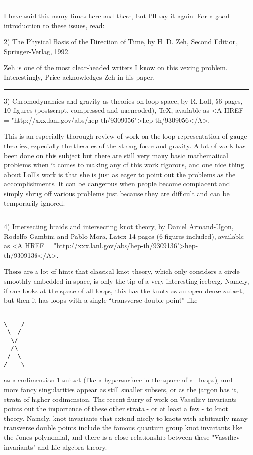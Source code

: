 \par\noindent\rule{\textwidth}{0.4pt}
I have said this many times here and there, but I'll say it again.  For
a good introduction to these issues, read:

2) The Physical Basis of the Direction of Time, by H. D. Zeh, Second
Edition, Springer-Verlag, 1992.

Zeh is one of the most clear-headed writers I know on this vexing
problem.  Interestingly, Price acknowledges Zeh in his paper.

\par\noindent\rule{\textwidth}{0.4pt}

3)  Chromodynamics and gravity as theories on loop space, by R.
Loll, 56 pages, 10 figures (postscript, compressed and uuencoded), TeX,
available as <A HREF = "http://xxx.lanl.gov/abs/hep-th/9309056">hep-th/9309056</A>.

This is an especially thorough review of work on the loop representation
of gauge theories, especially the theories of the strong force and
gravity.  A lot of work has been done on this subject but there are
still very many basic mathematical problems when it comes to making any
of this work rigorous, and one nice thing about Loll's work is that she
is just as eager to point out the problems as the accomplishments.  It
can be dangerous when people become complacent and simply shrug off
various problems just because they are difficult and can be temporarily
ignored.  

\par\noindent\rule{\textwidth}{0.4pt}

4) Intersecting braids and intersecting knot theory, by Daniel Armand-Ugon,
Rodolfo Gambini and Pablo Mora, Latex 14 pages (6 figures included),
available as <A HREF = "http://xxx.lanl.gov/abs/hep-th/9309136">hep-th/9309136</A>. 

There are a lot of hints that classical knot theory, which only
considers a circle smoothly embedded in space, is only the tip of a very
interesting iceberg.  Namely, if one looks at the space of all loops,
this has the knots as an open dense subset, but then it has loops with a
single ``transverse double point'' like


\begin{verbatim}

\    /
 \  /
  \/
  /\
 /  \
/    \
\end{verbatim}
    

as a codimension 1 subset (like a hypersurface in the space of all
loops), and more fancy singularities appear as still smaller subsets, or
as the jargon has it, strata of higher codimension.  The recent flurry
of work on Vassiliev invariants points out the importance of these other
strata - or at least a few - to knot theory.  Namely, knot invariants
that extend nicely to knots with arbitrarily many transverse double
points include the famous quantum group knot invariants like the Jones
polynomial, and there is a close relationship between these "Vassiliev
invariants" and Lie algebra theory.

